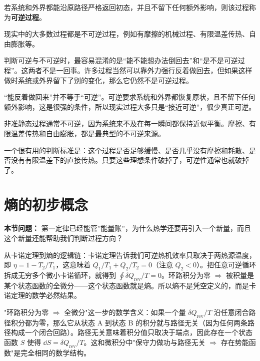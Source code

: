 \documentclass[lang=cn,11pt]{elegantbook}
\newcommand{\bridge}[1]{\begin{note}#1\end{note}}
\begin{document}
\begin{definition}[可逆过程]\label{def:reversible-process}
若系统和外界都能沿原路径严格返回初态，并且不留下任何额外影响，则该过程称为\textbf{可逆过程}。
\end{definition}

现实中的大多数过程都是不可逆过程，例如有摩擦的机械过程、有限温差传热、自由膨胀等。

判断可逆与不可逆时，最容易混淆的是“能不能想办法倒回去”和“是不是可逆过程”。这两者不是一回事。许多过程当然可以靠外力强行反着做回去，但如果这样做时系统或外界留下了别的变化，那么它仍然不是可逆过程。

\begin{note}
“能反着做回来”并不等于“可逆”。可逆要求系统和外界都恢复原状，且不留下任何额外影响，这是很强的条件，所以现实过程大多只是“接近可逆”，很少真正可逆。
\end{note}

\begin{remark}
非准静态过程通常不可逆，因为系统来不及在每一瞬间都保持近似平衡。摩擦、有限温差传热和自由膨胀，都是最典型的不可逆来源。
\end{remark}

\begin{remark}
一个很有用的判断标准是：这个过程是否足够缓慢、是否几乎没有摩擦和耗散、是否没有有限温差下的直接传热。只要这些理想条件破掉了，可逆性通常也就破掉了。
\end{remark}

\section{熵的初步概念}

\textbf{本节问题：} 第一定律已经能管”能量账”，为什么热学还要再引入一个新量，而且这个新量还能帮助我们判断过程方向？

\bridge{从卡诺定理到熵的逻辑链：卡诺定理告诉我们可逆热机效率只取决于两热源温度，即 \(\eta=1-T_2/T_1\)，这意味着 \(Q_1/T_1+Q_2/T_2=0\)（注意 \(Q_2<0\)）。把任意可逆循环拆成无穷多个微小卡诺循环，就得到 \(\oint\delta Q_{\mathrm{rev}}/T=0\)。环路积分为零 \(\Rightarrow\) 被积量是某个状态函数的全微分——这个状态函数就是熵。所以熵不是凭空定义的，而是卡诺定理的数学必然结果。}

\begin{remark}
"环路积分为零 \(\Rightarrow\) 全微分"这一步的数学含义：如果一个量 \(\delta Q_{\mathrm{rev}}/T\) 沿任意闭合路径积分都为零，那么它从状态 A 到状态 B 的积分就与路径无关（因为任何两条路径构成一个闭合回路）。路径无关意味着积分值只取决于端点，因此存在一个状态函数 \(S\) 使得 \(\dd S=\delta Q_{\mathrm{rev}}/T\)。这和微积分中"保守力做功与路径无关 \(\Rightarrow\) 存在势能函数"是完全相同的数学结构。
\end{remark}
\end{document}
